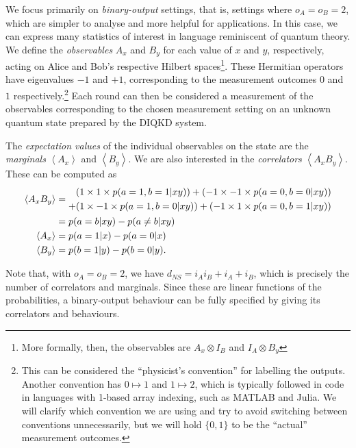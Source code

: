 \documentclass[10pt, a4paper]{article}
\numberwithin{equation}{section} %
\theoremstyle{definition}
\theoremstyle{plain}
\newcommand{\?}{\mathrel{?}} %
\newcommand{\angleb}[1]{\left\langle #1 \right\rangle} %
\begin{document}
  We focus primarily on \emph{binary-output} settings, that is, settings where \(o_A = o_B = 2\), which are simpler to analyse and more helpful for applications. In this case, we can express many statistics of interest in language reminiscent of quantum theory. We define the \emph{observables} \(A_x\) and \(B_y\) for each value of \(x\) and \(y\), respectively, acting on Alice and Bob's respective Hilbert spaces\footnote{More formally, then, the observables are \(A_x \otimes I_B\) and \(I_A \otimes B_y\)}. These Hermitian operators have eigenvalues \(-1\) and \(+1\), corresponding to the measurement outcomes \(0\) and \(1\) respectively.\footnote{This can be considered the ``physicist's convention'' for labelling the outputs. Another convention has \(0 \mapsto 1\) and \(1 \mapsto 2\), which is typically followed in code in languages with 1-based array indexing, such as MATLAB and Julia. We will clarify which convention we are using and try to avoid switching between conventions unnecessarily, but we will hold \(\{0,1\}\) to be the ``actual'' measurement outcomes.} Each round can then be considered a measurement of the observables corresponding to the chosen measurement setting on an unknown quantum state prepared by the DIQKD system.

  The \emph{expectation values} of the individual observables on the state are the \emph{marginals} \(\angleb{A_x}\) and \(\angleb{B_y}\). We are also interested in the \emph{correlators} \(\angleb{A_x B_y}\). These can be computed as
  \begin{align}
    \angleb{A_x B_y} &= \begin{aligned}[c]
      (1 \times 1 \times p(a=1,b=1|xy)) + (-1 \times -1 \times p(a=0,b=0|xy)) \\
      + (1 \times -1 \times p(a=1,b=0|xy)) + (-1 \times 1 \times p(a=0,b=1|xy))
    \end{aligned} \notag \\
                     &= p(a=b|xy) - p(a\neq b|xy) \\
      \angleb{A_x} &= p(a=1|x) - p(a=0|x) \\
      \angleb{B_y} &= p(b=1|y) - p(b=0|y).
    \end{align}

    Note that, with \(o_A = o_B = 2\), we have \(d_{NS} = {i_A}{i_B} + i_A + i_B\), which is precisely the number of correlators and marginals. Since these are linear functions of the probabilities, a binary-output behaviour can be fully specified by giving its correlators and behaviours.
\end{document}
